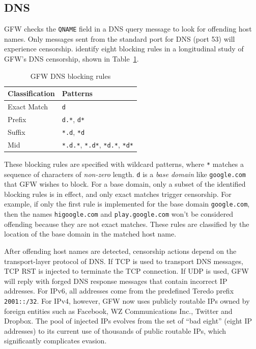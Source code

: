 \documentclass[sigconf, screen, balance=false]{acmart}
\begin{document}
\subsection{DNS}

GFW checks the \texttt{QNAME} field in a DNS query message to look for offending host names. Only messages sent from the standard port for DNS (port 53) will experience censorship. \cite{anonymous2020triplet, lowe2007a} \citeauthor{nguyen2021how} identify eight blocking rules in a longitudinal study of GFW's DNS censorship, shown in Table~\ref{tbl:dns-blocking-rules}.

\begin{table}[ht]
    \caption{GFW DNS blocking rules}
    \label{tbl:dns-blocking-rules}
    \begin{tabular}{@{}ll@{}}
        \toprule
        Classification & Patterns \\ \midrule
        Exact Match & \texttt{d} \\
        Prefix & \texttt{d.*},  \texttt{d*} \\
        Suffix & \texttt{*.d}, \texttt{*d} \\
        Mid & \texttt{*.d.*}, \texttt{*.d*}, \texttt{*d.*}, \texttt{*d*} \\
        \bottomrule
    \end{tabular}
\end{table}

These blocking rules are specified with wildcard patterns, where \texttt{*} matches a sequence of characters of \emph{non-zero} length. \texttt{d} is a \emph{base domain} like \texttt{google.com} that GFW wishes to block. For a base domain, only a subset of the identified blocking rules is in effect, and only exact matches trigger censorship. For example, if only the first rule is implemented for the base domain \texttt{google.com}, then the names \texttt{higoogle.com} and \texttt{play.google.com} won't be considered offending because they are not exact matches. These rules are classified by the location of the base domain in the matched host name.

After offending host names are detected, censorship actions depend on the transport-layer protocol of DNS. If TCP is used to transport DNS messages, TCP RST is injected to terminate the TCP connection. \cite{wang2017your} If UDP is used, GFW will reply with forged DNS response messages that contain incorrect IP addresses. For IPv6, all addresses come from the predefined Teredo prefix \texttt{2001::/32}. For IPv4, however, GFW now uses publicly routable IPs owned by foreign entities such as Facebook, WZ Communications Inc., Twitter and Dropbox. \cite{nguyen2021how} The pool of injected IPs evolves from the set of ``bad eight'' \cite{lowe2007a} (eight IP addresses) to its current use of thousands of public routable IPs, which significantly complicates evasion.
\end{document}
